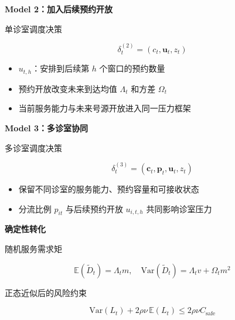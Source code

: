 \documentclass[aspectratio=169,UTF8,zihao=-4]{ctexbeamer}
\newcommand{\bigidea}[1]{
  \begin{center}
    \vspace{0.8em}
    {\LARGE \bfseries #1}
    \vspace{0.6em}
  \end{center}
}
\begin{document}
\begin{frame}
  \bigidea{Model 2：加入后续预约开放}
  \begin{block}{单诊室调度决策}
  \begin{center}
    {\Large
    \[
      \delta_t^{(2)}=(c_t,\mathbf{u}_t,z_t)
    \]
    }
  \end{center}
  \end{block}
  \begin{itemize}
    \item \Large $u_{t,h}$：安排到后续第 $h$ 个窗口的预约数量
    \item \Large 预约开放改变未来到达均值 $\Lambda_t$ 和方差 $\Omega_t$
    \item \Large 当前服务能力与未来号源开放进入同一压力框架
  \end{itemize}
\end{frame}

\begin{frame}
  \bigidea{Model 3：多诊室协同}
  \begin{block}{多诊室调度决策}
  \begin{center}
    {\Large
    \[
      \delta_t^{(3)}=(\mathbf{c}_t,\mathbf{p}_t,\mathbf{u}_t,z_t)
    \]
    }
  \end{center}
  \end{block}
  \begin{itemize}
    \item \Large 保留不同诊室的服务能力、预约容量和可接收状态
    \item \Large 分流比例 $p_{it}$ 与后续预约开放 $u_{i,t,h}$ 共同影响诊室压力
  \end{itemize}
\end{frame}

\begin{frame}
  \bigidea{确定性转化}
  \begin{block}{随机服务需求矩}
  \begin{center}
    {\Large
    \[
      \mathbb{E}(\widetilde{D}_t)=\Lambda_t m,\quad
      \mathrm{Var}(\widetilde{D}_t)=\Lambda_t v+\Omega_t m^2
    \]
    }
  \end{center}
  \end{block}
  \begin{block}{正态近似后的风险约束}
  \begin{center}
    {\Large
    \[
      \mathrm{Var}(L_t)+2\rho\nu\,\mathbb{E}(L_t)\leq 2\rho\nu C_{\mathrm{safe}}
    \]
    }
  \end{center}
  \end{block}
\end{frame}
\end{document}
